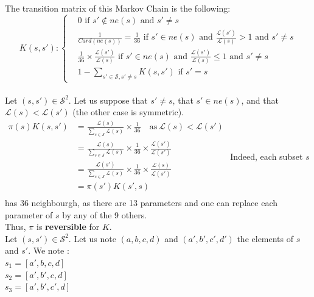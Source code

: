 The transition matrix of this Markov Chain is the following: 
\[
K(s, s'): \left\{
\begin{aligned}
& 0 \text{ if } s' \notin ne(s) \text{ and } s' \neq s   \\
& \frac{1}{Card(ne(s))} = \frac{1}{36} \text{ if } s' \in ne(s) \text{ and } \frac{\mathcal{L}(s')}{\mathcal{L}(s)} > 1 \text{ and } s' \neq s \\
& \frac{1}{36} \times \frac{\mathcal{L}(s')}{\mathcal{L}(s)} \text{ if } s' \in ne(s) \text{ and } \frac{\mathcal{L}(s')}{\mathcal{L}(s)} \leq 1  \text{ and } s' \neq s  \\
& 1 - \sum_{s' \in \mathcal{S}, s' \neq s}K(s, s') \text{ if } s' = s 
\end{aligned}
\right.
\]
\\[0.3cm]

Let $(s, s') \in \mathcal{S}^2$. Let us suppose that $ s' \neq s$, that  $s' \in ne(s)$, and that $\mathcal{L}(s) < \mathcal{L}(s')$ (the other case is symmetric). \\[0.15cm]
$
\begin{aligned}
    \pi(s)K(s, s') &=  \frac{\mathcal{L}(s)}{\sum_{s \in \mathcal{S}} \mathcal{L}(s)} \times \frac{1}{36} \quad \text{as} \ \mathcal{L}(s) < \mathcal{L}(s') \\
    &=  \frac{\mathcal{L}(s)}{\sum_{s \in \mathcal{S}} \mathcal{L}(s)} \times \frac{1}{36} \times \frac{\mathcal{L}(s')}{\mathcal{L}(s')} \\
    &=  \frac{\mathcal{L}(s')}{\sum_{s \in \mathcal{S}} \mathcal{L}(s)} \times \frac{1}{36} \times \frac{\mathcal{L}(s)}{\mathcal{L}(s')} \\
    &= \pi(s')K(s', s)\\[0.3cm]
\end{aligned}
$
Indeed, each subset $s$ has 36 neighbourgh, as there are 13 parameters and one can replace each parameter of $s$ by any of the 9 others. \\
Thus, $\pi$ is \textbf{reversible} for $K$.\\
Let $(s, s') \in \mathcal{S}^2$. Let us note $(a, b, c, d)$ and $(a', b', c', d')$ the elements of $s$ and $s'$.
We note : \\
$s_1 = [a', b, c, d]$\\
$ s_2 = [a', b', c, d]$ \\
$s_3 = [a', b', c', d]$ \\


